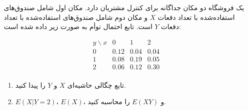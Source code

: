 \problem{}
یک فروشگاه دو مکان جداگانه برای کنترل مشتریان دارد. مکان اول شامل صندوق‌های استفاده‌شده با تعداد دفعات $X$ و مکان دوم شامل صندوق‌های استفاده‌شده با تعداد دفعات $Y$ است. تابع احتمال توأم به صورت زیر داده شده است:

\[
\begin{array}{c|ccc}
y \backslash x & 0 & 1 & 2 \\
\hline
0 & 0.12 & 0.04 & 0.04 \\
1 & 0.08 & 0.19 & 0.05 \\
2 & 0.06 & 0.12 & 0.30 \\
\end{array}
\]

\begin{enumerate}
    \item تابع چگالی حاشیه‌ای $X$ و $Y$ را پیدا کنید.
    \item $E(X|Y=2)$، $E(X)$، و $E(XY)$ را محاسبه کنید.
\end{enumerate}
